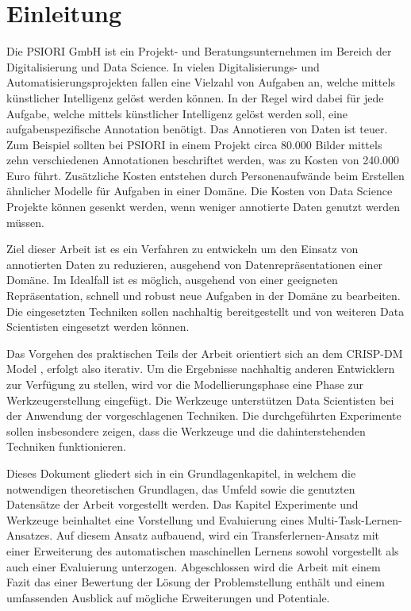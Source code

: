 \listoftodos

\chapter{Einleitung}
\label{chap:Einleitung}
	Die PSIORI GmbH \cite{PSIORIGmbH.2020} ist ein Projekt- und Beratungsunternehmen im Bereich der Digitalisierung und Data Science. In vielen Digitalisierungs- und Automatisierungsprojekten fallen eine Vielzahl von Aufgaben an, welche mittels künstlicher Intelligenz gelöst werden können. In der Regel wird dabei für jede Aufgabe, welche mittels künstlicher Intelligenz gelöst werden soll, eine aufgabenspezifische Annotation benötigt. Das Annotieren von Daten ist teuer. Zum Beispiel sollten bei PSIORI in einem Projekt circa 80.000 Bilder mittels zehn verschiedenen Annotationen beschriftet werden, was zu Kosten von 240.000 Euro führt. Zusätzliche Kosten entstehen durch Personenaufwände beim Erstellen ähnlicher Modelle für Aufgaben in einer Domäne. Die Kosten von Data Science Projekte können gesenkt werden, wenn weniger annotierte Daten genutzt werden müssen.
	
	Ziel dieser Arbeit ist es ein Verfahren zu entwickeln um den Einsatz von annotierten Daten zu reduzieren, ausgehend von Datenrepräsentationen einer Domäne. Im Idealfall ist es möglich, ausgehend von einer geeigneten Repräsentation, schnell und robust neue Aufgaben in der Domäne zu bearbeiten. Die eingesetzten Techniken sollen nachhaltig bereitgestellt und von weiteren Data Scientisten eingesetzt werden können.
	
	Das Vorgehen des praktischen Teils der Arbeit orientiert sich an dem CRISP-DM Model \cite{Shearer.2000}, erfolgt also iterativ. Um die Ergebnisse nachhaltig anderen Entwicklern zur Verfügung zu stellen, wird vor die Modellierungsphase eine Phase zur Werkzeugerstellung eingefügt. Die Werkzeuge unterstützen Data Scientisten bei der Anwendung der vorgeschlagenen Techniken. Die durchgeführten Experimente sollen insbesondere zeigen, dass die Werkzeuge und die dahinterstehenden Techniken funktionieren. 
	
	Dieses Dokument gliedert sich in ein Grundlagenkapitel, in welchem die notwendigen theoretischen Grundlagen, das Umfeld sowie die genutzten Datensätze der Arbeit vorgestellt werden. Das Kapitel Experimente und Werkzeuge beinhaltet eine Vorstellung und Evaluierung eines Multi-Task-Lernen-Ansatzes. Auf diesem Ansatz aufbauend, wird ein Transferlernen-Ansatz mit einer Erweiterung des automatischen maschinellen Lernens sowohl vorgestellt als auch einer Evaluierung unterzogen. Abgeschlossen wird die Arbeit mit einem Fazit das einer Bewertung der Lösung der Problemstellung enthält und einem umfassenden Ausblick auf mögliche Erweiterungen und Potentiale.
